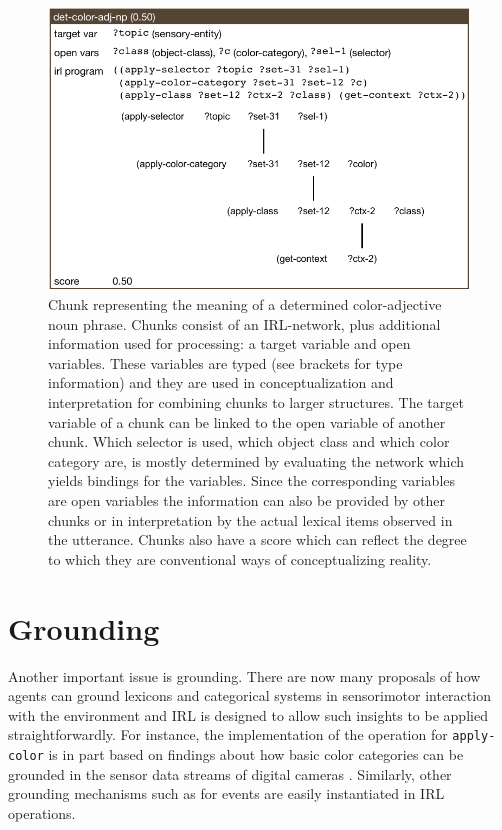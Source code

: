 \begin{figure}
\center
\includegraphics[width=.8\textwidth]{figs/det-color-adj-np-chunk}
\caption[Color-adjective noun phrase chunk]{Chunk representing the 
meaning of a determined color-adjective noun phrase. Chunks consist 
of an IRL-network, plus additional information used for processing: 
a target variable and open variables. These variables are typed 
(see brackets for type information)
and they are used in conceptualization and interpretation for combining chunks
to larger structures. The target variable of a chunk can be linked to the open
variable of another chunk. Which selector is used, 
which object class and which color category are, is mostly
determined by evaluating the network which yields bindings for
the variables. Since the corresponding variables are open variables
the information can also be provided by other chunks or in interpretation
by the actual lexical items observed in the utterance. Chunks also have a score
which can reflect the degree to which they are conventional 
ways of conceptualizing reality.}
\label{f:the-red-block-chunk}
\end{figure}


\section{Grounding}
Another important issue is grounding. 
There are now many proposals of how agents can ground lexicons and 
categorical systems in sensorimotor interaction with the environment 
\citep{billard1998grounding,vogt2001bootstrapping,steels2008grounding} and 
IRL is designed to allow such 
insights to be applied straightforwardly. For instance, the 
implementation of the operation for {\footnotesize\texttt{apply-color}} is in part based on 
findings about how basic color categories can be grounded in the sensor 
data streams of digital cameras \citep{steels2005coordinating,bleys2009grounded}.
Similarly, other grounding mechanisms such as for events 
\citep{siskind2001grounding,steels2003events} are easily instantiated in IRL operations. 

